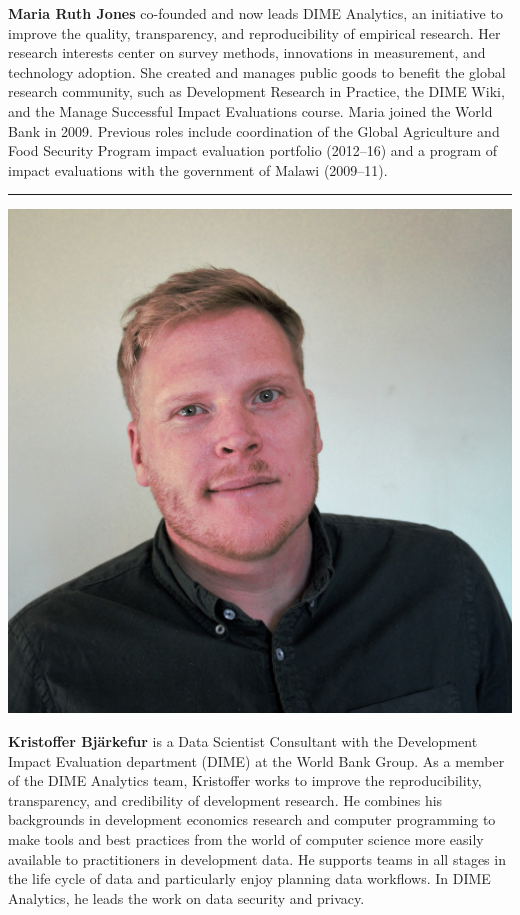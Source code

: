 \documentclass[
]{book}
\begin{document}
\textbf{Maria Ruth Jones} co-founded and now leads DIME Analytics, an initiative to improve the quality, transparency, and reproducibility of empirical research. Her research interests center on survey methods, innovations in measurement, and technology adoption. She created and manages public goods to benefit the global research community, such as Development Research in Practice, the DIME Wiki, and the Manage Successful Impact Evaluations course. Maria joined the World Bank in 2009. Previous roles include coordination of the Global Agriculture and Food Security Program impact evaluation portfolio (2012--16) and a program of impact evaluations with the government of Malawi (2009--11).

\begin{center}\rule{0.5\linewidth}{0.5pt}\end{center}

\includegraphics{author-bios/kristoffer-pic.jpg}

\textbf{Kristoffer Bjärkefur} is a Data Scientist Consultant with the Development Impact Evaluation department (DIME) at the World Bank Group. As a member of the DIME Analytics team, Kristoffer works to improve the reproducibility, transparency, and credibility of development research. He combines his backgrounds in development economics research and computer programming to make tools and best practices from the world of computer science more easily available to practitioners in development data. He supports teams in all stages in the life cycle of data and particularly enjoy planning data workflows. In DIME Analytics, he leads the work on data security and privacy.
\end{document}
